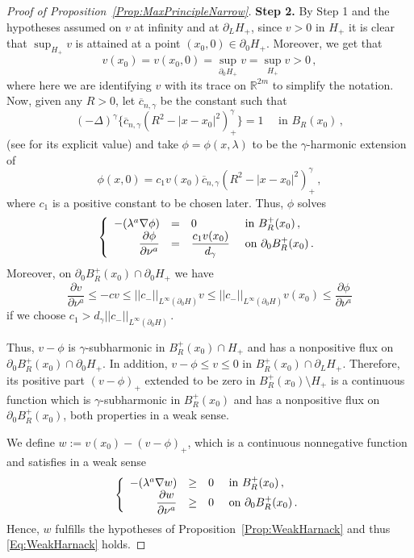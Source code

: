 \documentclass[12pt,reqno]{amsart}
\theoremstyle{definition}
\theoremstyle{remark}
\newcommand{\con}[1]{\mathbb{#1}}
\newcommand{\R}{\con{R}} %
\newcommand{\norm}[1]{\left | \left |{#1} \right | \right |}
\newcommand{\s}{\gamma}
\newcommand{\fraclaplacian}{(-\Delta)^\s}
\newcommand\beqc[1]{\left\{\begin{array}{#1}}
\newcommand\eeqc{\end{array} \right.}
\def\PDEsystem{rcll}
\let\div\relax
\DeclareMathOperator{\div}{div}
\numberwithin{equation}{section}
\begin{document}
\begin{proof}[Proof of Proposition~\ref{Prop:MaxPrincipleNarrow}]
\textbf{Step 2.}
By Step 1 and the hypotheses assumed on $v$ at infinity and at $\partial_L H_+$, since $v>0$ in $H_+$ it is clear that $\sup_{H_+} v$ is attained at a point $(x_0,0)\in \partial_0 H_+$. Moreover, we get that  
\begin{equation}
\label{Eq:PositiveSuprem}
v(x_0)= v(x_0,0) = \sup_{\partial_0 H_+} v = \sup_{H_+} v  > 0\,,
\end{equation}
where here we are identifying $v$ with its trace on $\R^{2m}$ to simplify the notation. Now, given any $R>0$, let $\overline{c}_{n,\s}$ be the constant such that
$$
\fraclaplacian \{ \overline{c}_{n,\s} (R^2 - |x-x_0|^2)^\s_+ \} = 1 \quad \text{ in } B_R (x_0)\,,
$$
(see \cite{BogdanEtAl} for its explicit value) and take $\phi = \phi(x,\lambda)$ to be the $\s$-harmonic extension of 
$$
\phi(x,0) = c_1 v(x_0)  \overline{c}_{n,\s}  (R^2 - |x-x_0|^2)^\s_+\,,
$$
where $c_1$ is a positive constant to be chosen later. Thus, $\phi$ solves
$$
\beqc{\PDEsystem}
-\div(\lambda^a \nabla \phi) &=& 0 & \text{ in } B^+_R(x_0)\,, \\
\dfrac{\partial \phi}{\partial \nu^a} & = & \dfrac{c_1 v(x_0)}{d_\s} & \text{ on } \partial_0 B^+_R(x_0)\,.
\eeqc
$$
Moreover, on $\partial_0 B^+_R(x_0) \cap \partial_0H_+$ we have
$$
\dfrac{\partial v}{\partial \nu^a} \leq - c v  \leq \norm{c_-}_{L^\infty (\partial_0H)} v \leq  \norm{c_-}_{L^\infty (\partial_0 H)} v(x_0) \leq \dfrac{\partial \phi}{\partial \nu^a}
$$
if we choose $c_1 > d_\s\norm{c_-}_{L^\infty (\partial_0 H)}$\,.

Thus, $v-\phi$ is $\s$-subharmonic in $B^+_R(x_0) \cap  H_+$ and has a nonpositive flux on $\partial_0 B^+_R(x_0) \cap \partial_0 H_+$. In addition, $v-\phi \leq v \leq 0$ in $B_R^+(x_0)\cap \partial_L  H_+$. Therefore, its positive part $(v-\phi)_+$ extended to be zero in $B_R^+(x_0)\setminus  H_+ $ is a continuous function which is $\s$-subharmonic in $B^+_R(x_0)$ and has a nonpositive flux on $\partial_0 B^+_R(x_0)$, both properties in a weak sense.

We define $w := v(x_0)-(v-\phi)_+$, which is a continuous nonnegative function and satisfies in a weak sense
$$
\beqc{\PDEsystem}
-\div(\lambda^a \nabla w) &\geq & 0 & \text{ in } B^+_R(x_0) \,, \\
\dfrac{\partial w}{\partial \nu^a} & \geq & 0 & \text{ on } \partial_0 B^+_R(x_0)  \,.
\eeqc
$$
Hence, $w$ fulfills the hypotheses of Proposition~\ref{Prop:WeakHarnack} and thus \eqref{Eq:WeakHarnack} holds.


\end{proof}
\end{document}
